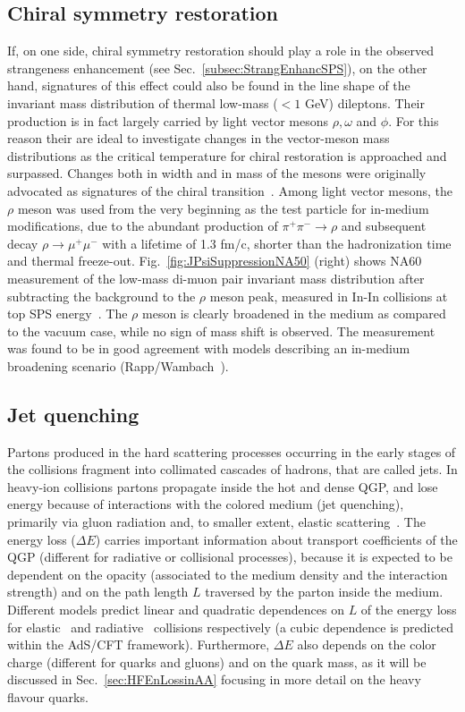 \subsection{Chiral symmetry restoration}
If, on one side, chiral symmetry restoration should play a role in the 
observed strangeness enhancement (see Sec.~\ref{subsec:StrangEnhancSPS}),
on the other hand, signatures of this effect could also be found in the line shape of the
invariant mass distribution of thermal low-mass ($< 1$ GeV) dileptons.
Their production is in fact largely carried by light 
vector mesons $\rho, \omega$ and $\phi$. For this reason their are ideal to investigate
changes in the vector-meson mass distributions as the critical temperature for chiral
restoration is approached and surpassed. Changes both in width and in mass of
the mesons were originally advocated as signatures of the chiral transition~\cite{Pisarski:1981mq}. 
Among light vector mesons, the $\rho$ meson was used from the very beginning as the test particle for in-medium 
modifications, due to the abundant production
of $\pi^+ \pi^- \rightarrow \rho$ and subsequent decay $\rho \rightarrow \mu^+ \mu^- $ 
with a lifetime of 1.3 fm/c, shorter than the hadronization time and thermal freeze-out. 
Fig.~\ref{fig:JPsiSuppressionNA50} (right) shows NA60 measurement of the 
low-mass di-muon pair invariant mass distribution after 
subtracting the background to the $\rho$ meson peak, 
measured in In-In collisions at top SPS energy~\cite{Damjanovic:2005ni}. The $\rho$ meson is
clearly broadened in the medium as compared to the vacuum case, 
while no sign of mass shift is observed. The measurement
was found to be in good agreement with models describing an in-medium broadening 
scenario (Rapp/Wambach~\cite{Rapp:2012zq}).

\subsection{Jet quenching}
\label{sec:JetQuenching}
Partons produced in the hard scattering processes occurring in the early stages of the 
collisions fragment into collimated cascades of hadrons, that are called jets. 
In heavy-ion collisions partons propagate inside the hot and dense QGP,
 and lose energy because of interactions with the colored medium 
 (jet quenching), primarily via gluon radiation and, to smaller extent, 
 elastic scattering~\cite{Qin:2015srf}. The energy loss ($\Delta E$) carries 
 important information about transport coefficients 
 of the QGP (different for radiative or collisional processes), because it
  is expected to be dependent on the opacity 
 (associated to the medium density and the interaction strength) 
 and on the path length $L$ traversed by the parton inside the medium.
  Different models predict linear and quadratic dependences on $L$ 
  of the energy loss for elastic~\cite{Thoma:1990fm} and radiative~\cite{Baier:1996sk} 
  collisions respectively (a cubic dependence is predicted within the 
  AdS/CFT framework). Furthermore, $\Delta E$ also depends on the 
  color charge (different for quarks and gluons) and on the quark mass, 
  as it will be discussed in Sec.~\ref{sec:HFEnLossinAA} focusing in more detail on the heavy flavour quarks.

